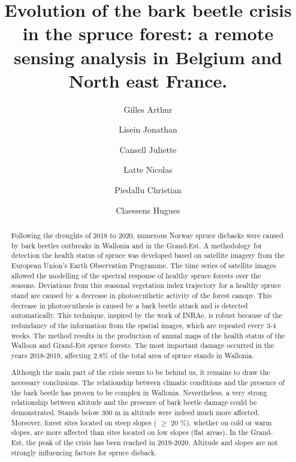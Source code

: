 \documentclass[3p,procedia]{elsarticle}
\begin{document}
\begin{frontmatter}

\author[label1]{Gilles Arthur}
\author[label1]{Lisein Jonathan}
\author[label2]{Cansell Juliette}
\author[label1]{Latte Nicolas}
\author[label3]{Piedallu Christian}
\author[label1]{Claessens Hugues}



\title{Evolution of the bark beetle crisis in the spruce forest: a remote sensing analysis in Belgium and North east France.}
\begin{abstract}
	
\iffalse




Following the droughts of 2018 to 2020, numerous Norway spruce diebacks were caused by bark beetles 
outbreaks in Wallonia and in the Grand-Est. 
A methodology for detection the health status of spruce was developed based on satellite imagery from the European Union's Earth Observation Programme.
The time series of satellite images allowed the modelling of the spectral response of healthy spruce forests over the seasons. Deviations from this seasonal vegetation index trajectory for a healthy spruce stand are caused by a decrease in photosynthetic activity of the forest canopy.
This decrease in photosynthesis is caused by a bark beetle attack and is detected automatically.
This technique, inspired by the work of INRAe, is robust because of the redundancy of the information from the spatial images, which are repeated every 3-4 weeks. 
The method results in the production of annual maps of the health status of the Walloon and Grand-Est spruce forests.
The most important damage occurred in the years 2018-2019, affecting 2.8\% of the total area of spruce stands in Wallonia.

Although the main part of the crisis seems to be behind us, it remains to draw the necessary conclusions.
The relationship between climatic conditions and the presence of the bark beetle has proven to be complex in Wallonia.
Nevertheless, a very strong relationship between altitude and the presence of bark beetle damage could be demonstrated.
Stands below 300 m in altitude were indeed much more affected.
Moreover, forest sites located on steep slopes ( $\ge$  20 \%), whether on cold or warm slopes, are more affected than sites located on low slopes (flat areas).
In the Grand-Est, the peak of the crisis has been reached in 2019-2020. Altitude and slopes are not strongly influencing factors for spruce dieback. 


\end{abstract}
\end{frontmatter}
\end{document}
